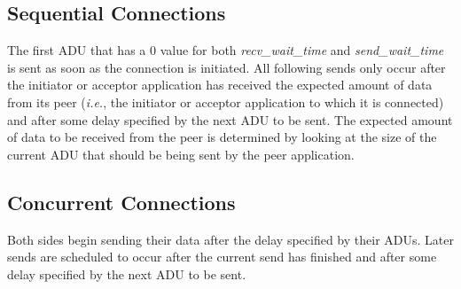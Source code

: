 




\subsection{Sequential Connections}

The first ADU that has a 0 value for both \emph{recv\_wait\_time} and
\emph{send\_wait\_time} is sent as soon as the connection is initiated.
All following sends only occur after the initiator or acceptor
application has received the expected amount of data from its peer
(\emph{i.e.}, the initiator or acceptor application to which it is connected)
and after some delay specified by the next ADU to be sent. The
expected amount of data to be received from the peer is determined by
looking at the size of the current ADU that should be being sent by
the peer application.

\subsection{Concurrent Connections}

Both sides begin sending their data after the delay specified by their
ADUs. Later sends are scheduled to occur after the current send
has finished and after some delay specified by the next ADU to be
sent.

